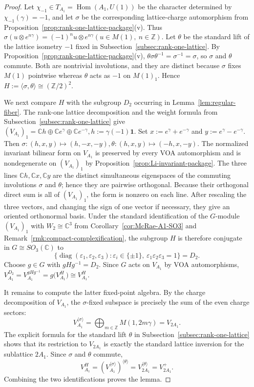 \documentclass[12pt,leqno]{amsart}
\numberwithin{equation}{section} \newtheorem{thm}{Theorem}[section] \newtheorem{lem}[thm]{Lemma} \newtheorem{ex}[thm]{Example} \newtheorem{prop}[thm]{Proposition} \newtheorem{cor}[thm]{Corollary} \newtheorem{defi}[thm]{Definition} \newtheorem{rmk}[thm]{Remark} \newtheorem{notation}[thm]{Notation}
\newcommand{\one}{\mathbf{1}}
\newcommand{\Hom}{\operatorname{Hom}}
\def\Z{\mathbb{Z}} \def\N{\mathbb{N}} \def\A{\mathbb{A}} \def\C{\mathbb{C}} \def\R{\mathbb{R}} \def\Q{\mathbb{Q}} \def\F{\mathbb{F}}
\begin{document}
\begin{proof}
Let $\chi_{-1}\in T_{A_1}=\Hom(A_1,U(1))$ be the character determined by \(\chi_{-1}(\gamma)=-1\), and let $\sigma$ be the corresponding lattice-charge automorphism from Proposition~\ref{prop:rank-one-lattice-package}\textnormal{(v)}. Thus \(\sigma(u\otimes e^{n\gamma})=(-1)^n u\otimes e^{n\gamma} (u\in M(1),\ n\in\Z).\) Let $\theta$ be the standard lift of the lattice isometry $-1$ fixed in Subsection~\ref{subsec:rank-one-lattice}. By Proposition~\ref{prop:rank-one-lattice-package}\textnormal{(v)}, \(\theta\sigma\theta^{-1}=\sigma^{-1}=\sigma\), so $\sigma$ and $\theta$ commute. Both are nontrivial involutions, and they are distinct because $\sigma$ fixes $M(1)$ pointwise whereas $\theta$ acts as $-1$ on $M(1)_1$. Hence \(H:=\langle\sigma,\theta\rangle\cong(\Z/2)^2.\)

We next compare $H$ with the subgroup $D_2$ occurring in Lemma~\ref{lem:regular-fiber}. The rank-one lattice decomposition and the weight formula from Subsection~\ref{subsec:rank-one-lattice} give \((V_{A_1})_1 =\C h\oplus\C e^\gamma\oplus\C e^{-\gamma}, h:=\gamma(-1)\one.\) Set \(x:=e^\gamma+e^{-\gamma}\) and \(y:=e^\gamma-e^{-\gamma}.\) Then \(\sigma:(h,x,y)\longmapsto(h,-x,-y), \theta:(h,x,y)\longmapsto(-h,x,-y).\) The normalized invariant bilinear form on $V_{A_1}$ is preserved by every VOA automorphism and is nondegenerate on $(V_{A_1})_1$ by Proposition~\ref{prop:Li-invariant-package}. The three lines $\C h,\C x,\C y$ are the distinct simultaneous eigenspaces of the commuting involutions $\sigma$ and $\theta$; hence they are pairwise orthogonal. Because their orthogonal direct sum is all of $(V_{A_1})_1$, the form is nonzero on each line. After rescaling the three vectors, and changing the sign of one vector if necessary, they give an oriented orthonormal basis. Under the standard identification of the $G$-module $(V_{A_1})_1$ with $W_2\cong\C^3$ from Corollary~\ref{cor:McRae-A1-SO3} and Remark~\ref{rmk:compact-complexification}, the subgroup $H$ is therefore conjugate in $G\cong SO_3(\C)$ to
\[
\{\operatorname{diag}(\varepsilon_1,\varepsilon_2,\varepsilon_3):
\varepsilon_i\in\{\pm1\},\ \varepsilon_1\varepsilon_2\varepsilon_3=1\}
=D_2.
\]
Choose $g\in G$ with $gHg^{-1}=D_2$. Since $G$ acts on $V_{A_1}$ by VOA automorphisms, \(V_{A_1}^{D_2}=V_{A_1}^{gHg^{-1}}=g\bigl(V_{A_1}^{H}\bigr) \cong V_{A_1}^{H}.\)

It remains to compute the latter fixed-point algebra. By the charge decomposition of $V_{A_1}$, the $\sigma$-fixed subspace is precisely the sum of the even charge sectors:
\[
V_{A_1}^{\langle\sigma\rangle}=\bigoplus_{m\in\Z}M(1,2m\gamma)=V_{2A_1}.
\] The explicit formula for the standard lift $\theta$ in Subsection~\ref{subsec:rank-one-lattice} shows that its restriction to $V_{2A_1}$ is exactly the standard lattice inversion for the sublattice $2A_1$. Since $\sigma$ and $\theta$ commute,
\[
V_{A_1}^{H}
 =\left(V_{A_1}^{\langle\sigma\rangle}\right)^{\langle\theta\rangle}
 =V_{2A_1}^{\langle\theta\rangle}
 =V_{2A_1}^+.
\]
Combining the two identifications proves the lemma.
\end{proof}
\end{document}
